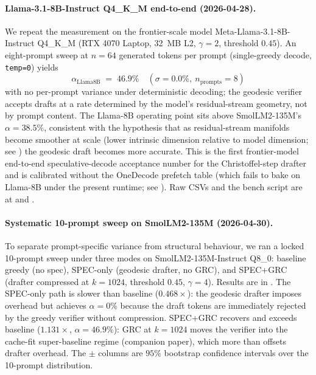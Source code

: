 \documentclass[11pt]{article}
\begin{document}
\paragraph{Llama-3.1-8B-Instruct Q4\_K\_M end-to-end (2026-04-28).}
We repeat the measurement on the frontier-scale model
Meta-Llama-3.1-8B-Instruct Q4\_K\_M (RTX 4070 Laptop, 32~MB L2,
$\gamma{=}2$, threshold $0.45$).  An eight-prompt sweep at $n{=}64$
generated tokens per prompt (single-greedy decode, \texttt{temp=0}) yields
\[
\alpha_\text{Llama8B} \;=\; \mathbf{46.9\%}\quad
(\sigma\!=\!0.0\%,\ n_\text{prompts}{=}8)
\]
with no per-prompt variance under deterministic decoding;
the geodesic verifier accepts drafts at a rate determined by the
model's residual-stream geometry, not by prompt content.
The Llama-8B operating point sits above SmolLM2-135M's
$\alpha{=}38.5\%$, consistent with the hypothesis that as residual-stream
manifolds become smoother at scale (lower intrinsic dimension relative
to model dimension; see ) the geodesic draft becomes more
accurate.  This is the first frontier-model end-to-end speculative-decode
acceptance number for the Christoffel-step drafter and is calibrated
without the OneDecode prefetch table (which fails to bake on Llama-8B
under the present runtime; see ).
Raw CSVs and the bench script are at
 and
.

\paragraph{Systematic 10-prompt sweep on SmolLM2-135M (2026-04-30).}
To separate prompt-specific variance from structural behaviour, we ran a
locked 10-prompt sweep under three modes on SmolLM2-135M-Instruct Q8\_0:
baseline greedy (no spec), SPEC-only (geodesic drafter, no GRC), and
SPEC+GRC (drafter compressed at $k{=}1024$, threshold $0.45$,
$\gamma{=}4$).  Results are in .
The SPEC-only path is slower than baseline ($0.468\times$): the
geodesic drafter imposes overhead but achieves $\alpha{=}0\%$
because the draft tokens are immediately rejected by the greedy
verifier without compression.  SPEC+GRC recovers and exceeds baseline
($1.131\times$, $\alpha{=}46.9\%$): GRC at $k{=}1024$ moves the verifier
into the cache-fit super-baseline regime (companion paper), which
more than offsets drafter overhead.  The $\pm$ columns are $95\%$
bootstrap confidence intervals over the 10-prompt distribution.
\end{document}
